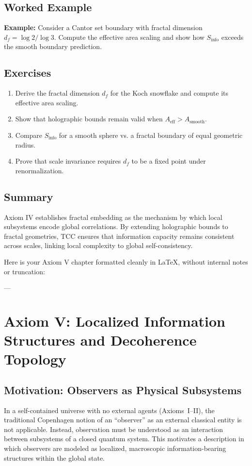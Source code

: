 \documentclass[12pt,openany]{book}
\theoremstyle{plain}
\theoremstyle{definition}
\theoremstyle{remark}
\begin{document}
\section{Worked Example}
\textbf{Example:} Consider a Cantor set boundary with fractal 
dimension $d_f = \log 2 / \log 3$. Compute the effective area scaling and show how 
$S_{\text{info}}$ exceeds the smooth boundary prediction.

\section{Exercises}
\begin{enumerate}
    \item Derive the fractal dimension $d_f$ for the Koch snowflake 
    and compute its effective area scaling.
    \item Show that holographic bounds remain valid when 
    $A_{\text{eff}} > A_{\text{smooth}}$.
    \item Compare $S_{\text{info}}$ for a smooth sphere vs. a fractal boundary 
    of equal geometric radius.
    \item Prove that scale invariance requires $d_f$ to be a fixed point 
    under renormalization.
\end{enumerate}

\section{Summary}
Axiom IV establishes fractal embedding as the mechanism by which 
local subsystems encode global correlations. By extending holographic 
bounds to fractal geometries, TCC ensures that information capacity 
remains consistent across scales, linking local complexity to 
global self-consistency.

Here is your Axiom V chapter formatted cleanly in LaTeX, without internal notes or truncation:

---

\chapter{Axiom V: Localized Information Structures and Decoherence Topology}

\section{Motivation: Observers as Physical Subsystems}

In a self-contained universe with no external agents (Axioms~I--II), the
traditional Copenhagen notion of an ``observer'' as an external classical
entity is not applicable. Instead, observation must be understood as an
interaction between subsystems of a closed quantum system. This motivates a
description in which observers are modeled as localized, macroscopic
information-bearing structures within the global state.
\end{document}
